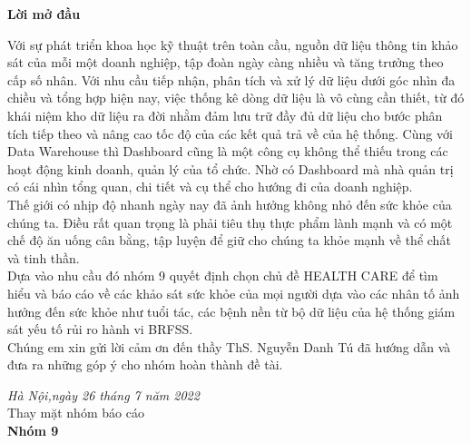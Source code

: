 \newpage
\fontsize{22pt}{16pt}\selectfont
\begin{center}
    {\bfseries Lời mở đầu}
\end{center}
\fontsize{13pt}{16pt}\selectfont
\bigskip

Với sự phát triển khoa học kỹ thuật trên toàn cầu, nguồn dữ liệu thông tin khảo sát của mỗi một doanh nghiệp, tập đoàn ngày càng nhiều và tăng trưởng theo cấp số nhân. Với nhu cầu tiếp nhận, phân tích và xử lý dữ liệu dưới góc nhìn đa chiều và tổng hợp hiện nay, việc thống kê dòng dữ liệu là vô cùng cần thiết, từ đó khái niệm kho dữ liệu ra đời nhằm đảm lưu trữ đầy đủ dữ liệu cho bước phân tích tiếp theo và nâng cao tốc độ của các kết quả trả về của hệ thống. Cùng với Data Warehouse thì Dashboard cũng là một công cụ không thể thiếu trong các hoạt động kinh doanh, quản lý của tổ chức. Nhờ có Dashboard mà nhà quản trị có cái nhìn tổng quan, chi tiết và cụ thể cho hướng đi của doanh nghiệp.\\

Thế giới có nhịp độ nhanh ngày nay đã ảnh hưởng không nhỏ đến sức khỏe của chúng ta. Điều rất quan trọng là phải tiêu thụ thực phẩm lành mạnh và có một chế độ ăn uống cân bằng, tập luyện để giữ cho chúng ta khỏe mạnh về thể chất và tinh thần.\\

Dựa vào nhu cầu đó nhóm 9 quyết định chọn chủ đề HEALTH CARE để tìm
hiểu và báo cáo về các khảo sát sức khỏe của mọi người dựa vào các nhân tố ảnh hưởng đến sức khỏe như tuổi tác, các bệnh nền từ bộ dữ liệu của hệ thống giám sát yếu tố rủi ro hành vi BRFSS.\\

Chúng em xin gửi lời cảm ơn đến thầy ThS. Nguyễn Danh Tú đã hướng dẫn và đưa ra những góp ý cho nhóm hoàn thành đề tài.

\begin{minipage}{0.5\textwidth}
\end{minipage}
\hspace{0.5\textwidth}
\begin{minipage}{0.5\textwidth}
	\noindent\begin{center}
		\vspace{1cm}
		\textit{Hà Nội,ngày 26 tháng 7 năm 2022} \\
		Thay mặt nhóm báo cáo\\ \vspace{1cm}
		\textbf{Nhóm 9}\\
	\end{center}	
\end{minipage}

